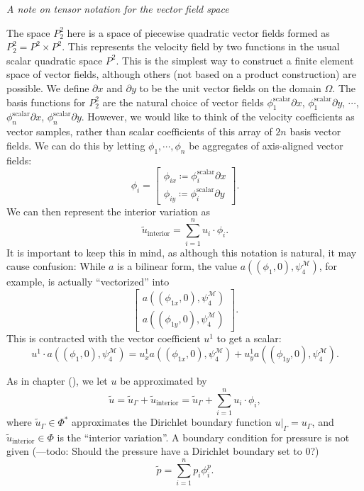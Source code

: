 \begin{aside}
\textit{A note on tensor notation for the vector field space}
\vskip 0.1in

The space $P^2_2$ here is a space of piecewise quadratic vector fields formed as $P^2_2 = P^2 \times P^2$.
This represents the velocity field by two functions in the usual scalar quadratic space $P^2$.
This is the simplest way to construct a finite element space of vector fields, although others (not based on a product construction) are possible.
We define $\partial x$ and $\partial y$ to be the unit vector fields on the domain $\Omega$.
The basis functions for $P^2_2$ are the natural choice of vector fields $\phi^\text{scalar}_1\partial x$, $\phi^\text{scalar}_1\partial y$, $\cdots$, $\phi^\text{scalar}_n\partial x$, $\phi^\text{scalar}_n\partial y$.
However, we would like to think of the velocity coefficients as vector samples, rather than scalar coefficients
of this array of $2n$ basis vector fields. We can do this by letting $\phi_1,\cdots,\phi_n$ be aggregates of axis-aligned vector fields:
    $$
        \phi_i = \begin{bmatrix}
        \phi_{ix} \coloneqq \phi^\text{scalar}_{i}\partial x\\
        \phi_{iy} \coloneqq \phi^\text{scalar}_{i}\partial y\end{bmatrix}.
    $$
We can then represent the interior variation as
    $$\tilde{u}_\text{interior} = \sum_{i=1}^n u_i \cdot \phi_i.$$
It is important to keep this in mind, as although this notation is natural, it may cause confusion:
While $a$ is a bilinear form, the value $a((\phi_1, 0), \psi^\mathcal{M}_4)$, for example, is actually ``vectorized''
into
    $$
        \begin{bmatrix}
            a((\phi_{1x}, 0), \psi^\mathcal{M}_4)\\
            a((\phi_{1y}, 0), \psi^\mathcal{M}_4)
        \end{bmatrix}.
    $$
This is contracted with the vector coefficient $u^1$ to get a scalar:
    $$
        u^1 \cdot a((\phi_1, 0), \psi^\mathcal{M}_4)
    = u^1_x a((\phi_{1x},0), \psi^\mathcal{M}_4)
        + u^1_y a((\phi_{1y},0), \psi^\mathcal{M}_4).
    $$
\end{aside}

As in chapter (), we let $u$ be approximated by
    $$\tilde{u} = \tilde{u}_\Gamma + \tilde{u}_\text{interior} = \tilde{u}_\Gamma + \sum_{i=1}^n u_i\cdot \phi_i,$$
where $\tilde{u}_\Gamma \in \Phi^*$ approximates the Dirichlet boundary function $\left.u\right|_\Gamma = u_\Gamma$,
and $\tilde{u}_{\text{interior}} \in \Phi$ is the ``interior variation''. A boundary condition for pressure is not given
(---todo: Should the pressure have a Dirichlet boundary set to $0$?)
    $$\tilde{p} = \sum_{i=1}^n p_i\phi^p_i.$$

